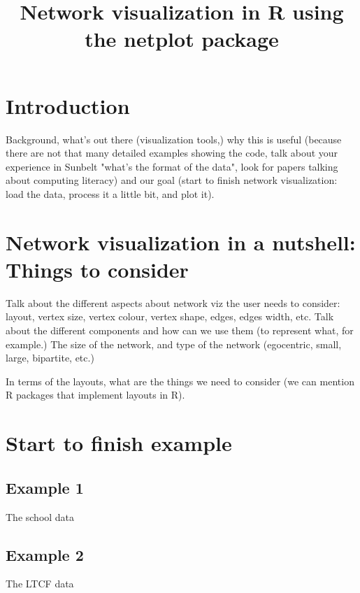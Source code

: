 \documentclass[jou,floatsintext]{apa7}
\title{Network visualization in R using the netplot package}
\begin{document}
\maketitle

\section{Introduction}

Background, what's out there (visualization tools,) why this is useful (because there are not that many detailed examples showing the code, talk about your experience in Sunbelt "what's the format of the data", look for papers talking about computing literacy) and our goal (start to finish network visualization: load the data, process it a little bit, and plot it).

\section{Network visualization in a nutshell: Things to consider}

Talk about the different aspects about network viz the user needs to consider: layout, vertex size, vertex colour, vertex shape, edges, edges width, etc. Talk about the different components and how can we use them (to represent what, for example.) The size of the network, and type of the network (egocentric, small, large, bipartite, etc.)

In terms of the layouts, what are the things we need to consider (we can mention R packages that implement layouts in R).

\section{Start to finish example}

\subsection{Example 1}

The school data

\subsection{Example 2}

The LTCF data

\printbibliography

\appendix
\end{document}
